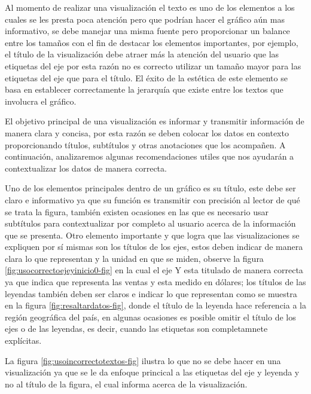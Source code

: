 \documentclass[
]{book}
\begin{document}
Al momento de realizar una visualización el texto es uno de los elementos a los cuales se les presta poca atención pero que podrían hacer el gráfico aún mas informativo, se debe manejar una misma fuente pero proporcionar un balance entre los tamaños con el fin de destacar los elementos importantes, por ejemplo, el título de la visualización debe atraer más la atención del usuario que las etiquetas del eje por esta razón no es correcto utilizar un tamaño mayor para las etiquetas del eje que para el título. El éxito de la estética de este elemento se basa en establecer correctamente la jerarquía que existe entre los textos que involucra el gráfico.

El objetivo principal de una visualización es informar y transmitir información de manera clara y concisa, por esta razón se deben colocar los datos en contexto proporcionando títulos, subtítulos y otras anotaciones que los acompañen. A continuación, analizaremos algunas recomendaciones utiles que nos ayudarán a contextualizar los datos de manera correcta.

Uno de los elementos principales dentro de un gráfico es su título, este debe ser claro e informativo ya que su función es transmitir con precisión al lector de qué se trata la figura, también existen ocasiones en las que es necesario usar subtítulos para contextualizar por completo al usuario acerca de la información que se presenta. Otro elemento importante y que logra que las visualizaciones se expliquen por sí mismas son los títulos de los ejes, estos deben indicar de manera clara lo que representan y la unidad en que se miden, observe la figura \ref{fig:usocorrectoejeyinicio0-fig} en la cual el eje Y esta titulado de manera correcta ya que indica que representa las ventas y esta medido en dólares; los títulos de las leyendas también deben ser claros e indicar lo que representan como se muestra en la figura \ref{fig:resaltardatos-fig}, donde el título de la leyenda hace referencia a la región geográfica del país, en algunas ocasiones es posible omitir el título de los ejes o de las leyendas, es decir, cuando las etiquetas son completamnete explícitas.

La figura \ref{fig:usoincorrectotextos-fig} ilustra lo que no se debe hacer en una visualización ya que se le da enfoque princical a las etiquetas del eje y leyenda y no al título de la figura, el cual informa acerca de la visualización.
\end{document}
